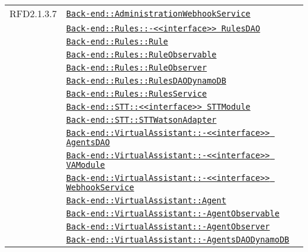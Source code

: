 \begin{longtable}{|>{\centering}m{3cm}|m{10cm}<{\centering}|}
RFD2.1.3.7 & \hyperref[Back-end::AdministrationWebhookService]{\texttt{Back-end::AdministrationWebhookService}}\\
& \hyperref[Back-end::Rules::<<interface>> RulesDAO]{\texttt{Back-end::Rules::-\linebreak <<interface>> RulesDAO}}\\
& \hyperref[Back-end::Rules::Rule]{\texttt{Back-end::Rules::Rule}}\\
& \hyperref[Back-end::Rules::RuleObservable]{\texttt{Back-end::Rules::RuleObservable}}\\
& \hyperref[Back-end::Rules::RuleObserver]{\texttt{Back-end::Rules::RuleObserver}}\\
& \hyperref[Back-end::Rules::RulesDAODynamoDB]{\texttt{Back-end::Rules::RulesDAODynamoDB}}\\
& \hyperref[Back-end::Rules::RulesService]{\texttt{Back-end::Rules::RulesService}}\\
& \hyperref[Back-end::STT::<<interface>> STTModule]{\texttt{Back-end::STT::<<interface>> STTModule}}\\
& \hyperref[Back-end::STT::STTWatsonAdapter]{\texttt{Back-end::STT::STTWatsonAdapter}}\\
& \hyperref[Back-end::VirtualAssistant::<<interface>> AgentsDAO]{\texttt{Back-end::VirtualAssistant::-\linebreak <<interface>> AgentsDAO}}\\
& \hyperref[Back-end::VirtualAssistant::<<interface>> VAModule]{\texttt{Back-end::VirtualAssistant::-\linebreak <<interface>> VAModule}}\\
& \hyperref[Back-end::VirtualAssistant::<<interface>> WebhookService]{\texttt{Back-end::VirtualAssistant::-\linebreak <<interface>> WebhookService}}\\
& \hyperref[Back-end::VirtualAssistant::Agent]{\texttt{Back-end::VirtualAssistant::Agent}}\\
& \hyperref[Back-end::VirtualAssistant::AgentObservable]{\texttt{Back-end::VirtualAssistant::-\linebreak AgentObservable}}\\
& \hyperref[Back-end::VirtualAssistant::AgentObserver]{\texttt{Back-end::VirtualAssistant::-\linebreak AgentObserver}}\\
& \hyperref[Back-end::VirtualAssistant::AgentsDAODynamoDB]{\texttt{Back-end::VirtualAssistant::-\linebreak AgentsDAODynamoDB}}\\

\end{longtable}
